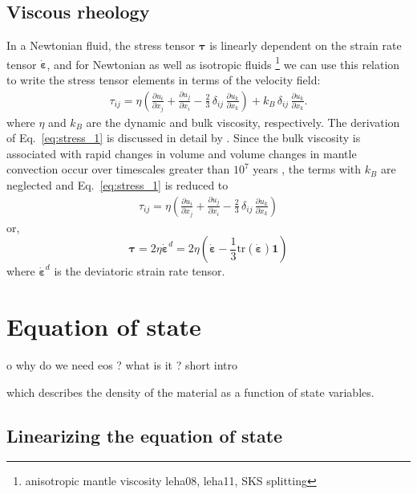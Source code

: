 \documentclass[a4paper]{article}
\begin{document}
\subsection{Viscous rheology}

In a Newtonian fluid, the stress tensor ${\bm \tau}$ is linearly dependent on 
the strain rate tensor $\dot{\bm \varepsilon}$, and for Newtonian as well as isotropic 
fluids \footnote{anisotropic mantle viscosity leha08, leha11, SKS splitting} we can use this relation to 
write the stress tensor elements in terms of the velocity field: 
\begin{align} \label{eq:stress_1}
\tau_{ij} = \eta \left( \frac{\partial u_i}{\partial x_j} + \frac{\partial u_j}{\partial x_i}
 - \frac{2}{3}\,\delta_{ij}\,\frac{\partial u_k}{\partial x_k} \right) 
 + k_B\,\delta_{ij}\,\frac{\partial u_k}{\partial x_k}.
\end{align}
where $\eta$ and $k_B$ are the dynamic and bulk viscosity, respectively. 
The derivation of Eq.~\eqref{eq:stress_1} is discussed in detail by \textcite{scto01}.
Since the bulk viscosity is associated with rapid changes in volume and volume changes in 
mantle convection occur over timescales greater than $10^7$ years \autocite{jamc80}, the terms with $k_B$ 
are neglected and Eq.~\eqref{eq:stress_1} is reduced to 
\begin{align} \label{eq:stress}
\tau_{ij} = \eta \left( \frac{\partial u_i}{\partial x_j} + \frac{\partial u_j}{\partial x_i}
 - \frac{2}{3}\,\delta_{ij}\,\frac{\partial u_k}{\partial x_k} \right) 
\end{align}
or, 
\[
{\bm \tau} = 2\eta \dot{\bm \varepsilon}^d = 2\eta \left( \dot{\bm \varepsilon}  - \frac13 \text{tr}(\dot{\bm \varepsilon})    {\bm 1} \right)
\]
where $ \dot{\bm \varepsilon}^d$ is the deviatoric strain rate tensor.

\section{Equation of state} \label{section:eq_state}

o{\color{red} why do we need eos ? what is it ? short intro}

which describes the density of the material as a function of state variables. 
\subsection{Linearizing the equation of state}
\end{document}
